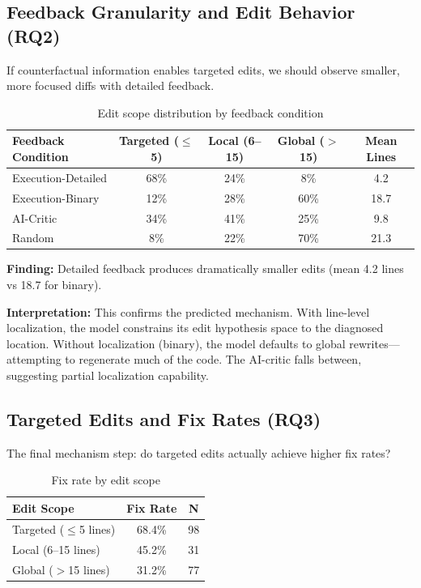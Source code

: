 \subsection{Feedback Granularity and Edit Behavior (RQ2)}

If counterfactual information enables targeted edits, we should observe smaller, more focused diffs with detailed feedback.

\begin{table}[h]
\centering
\caption{Edit scope distribution by feedback condition}
\label{tab:editscope}
\begin{tabular}{@{}lcccc@{}}
\toprule
\textbf{Feedback Condition} & \textbf{Targeted ($\leq$5)} & \textbf{Local (6--15)} & \textbf{Global ($>$15)} & \textbf{Mean Lines} \\
\midrule
Execution-Detailed & 68\% & 24\% & 8\% & 4.2 \\
Execution-Binary & 12\% & 28\% & 60\% & 18.7 \\
AI-Critic & 34\% & 41\% & 25\% & 9.8 \\
Random & 8\% & 22\% & 70\% & 21.3 \\
\bottomrule
\end{tabular}
\end{table}

\textbf{Finding:} Detailed feedback produces dramatically smaller edits (mean 4.2 lines vs 18.7 for binary).

\textbf{Interpretation:} This confirms the predicted mechanism. With line-level localization, the model constrains its edit hypothesis space to the diagnosed location. Without localization (binary), the model defaults to global rewrites---attempting to regenerate much of the code. The AI-critic falls between, suggesting partial localization capability.

\subsection{Targeted Edits and Fix Rates (RQ3)}

The final mechanism step: do targeted edits actually achieve higher fix rates?

\begin{table}[h]
\centering
\caption{Fix rate by edit scope}
\label{tab:fixrate}
\begin{tabular}{@{}lcc@{}}
\toprule
\textbf{Edit Scope} & \textbf{Fix Rate} & \textbf{N} \\
\midrule
Targeted ($\leq$5 lines) & 68.4\% & 98 \\
Local (6--15 lines) & 45.2\% & 31 \\
Global ($>$15 lines) & 31.2\% & 77 \\
\bottomrule
\end{tabular}
\end{table}

